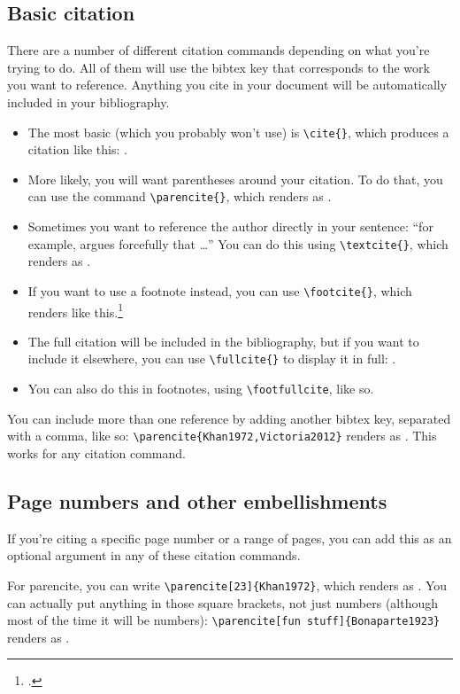 \documentclass[12pt]{article}
\begin{document}
\subsection{Basic citation}
There are a number of different citation commands depending on what you're trying to do. All of them will use the bibtex key that corresponds to the work you want to reference. Anything you cite in your document will be automatically included in your bibliography.
\begin{itemize}
	\item The most basic (which you probably won't use) is \verb+\cite{}+, which produces a citation like this: \cite{Khan1972}. 
	\item More likely, you will want parentheses around your citation. To do that, you can use the command \verb+\parencite{}+, which renders as \parencite{Khan1972}.
	\item Sometimes you want to reference the author directly in your sentence: ``for example, \textcite{Khan1972} argues forcefully that \ldots'' You can do this using \verb+\textcite{}+, which renders as \textcite{Khan1972}.
	\item If you want to use a footnote instead, you can use \verb+\footcite{}+, which renders like this.\footcite{Khan1972}
	\item The full citation will be included in the bibliography, but if you want to include it elsewhere, you can use \verb+\fullcite{}+ to display it in full: .
	\item You can also do this in footnotes, using \verb+\footfullcite+, like so.
\end{itemize}
You can include more than one reference by adding another bibtex key, separated with a comma, like so: \verb+\parencite{Khan1972,Victoria2012}+ renders as \parencite{Khan1972,Victoria2012}. This works for any citation command.

\subsection{Page numbers and other embellishments}

If you're citing a specific page number or a range of pages, you can add this as an optional argument in any of these citation commands. 

For parencite, you can write \verb+\parencite[23]{Khan1972}+, which renders as \parencite[23]{Khan1972}.  You can actually put anything in those square brackets, not just numbers (although most of the time it will be numbers): \verb+\parencite[fun stuff]{Bonaparte1923}+ renders as \parencite[fun stuff]{Bonaparte1923}.
\end{document}
